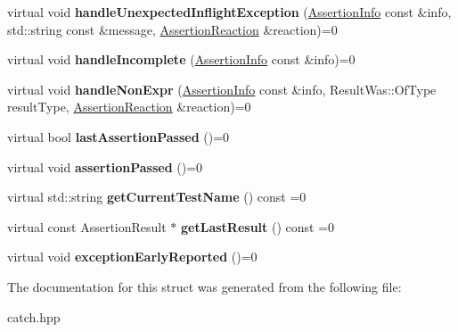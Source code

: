 \begin{DoxyCompactItemize}
\item 
\mbox{\label{structCatch_1_1IResultCapture_afc97bc69829185222f955ebeef97adfe}} 
virtual void {\bfseries handle\+Unexpected\+Inflight\+Exception} (\hyperlink{structCatch_1_1AssertionInfo}{Assertion\+Info} const \&info, std\+::string const \&message, \hyperlink{structCatch_1_1AssertionReaction}{Assertion\+Reaction} \&reaction)=0
\item 
\mbox{\label{structCatch_1_1IResultCapture_a89b89372eb09cc44f8dcad363de6157d}} 
virtual void {\bfseries handle\+Incomplete} (\hyperlink{structCatch_1_1AssertionInfo}{Assertion\+Info} const \&info)=0
\item 
\mbox{\label{structCatch_1_1IResultCapture_ab7dbdf8aa28427119583e24dbb302c63}} 
virtual void {\bfseries handle\+Non\+Expr} (\hyperlink{structCatch_1_1AssertionInfo}{Assertion\+Info} const \&info, Result\+Was\+::\+Of\+Type result\+Type, \hyperlink{structCatch_1_1AssertionReaction}{Assertion\+Reaction} \&reaction)=0
\item 
\mbox{\label{structCatch_1_1IResultCapture_a973435fbdcb2f6f07a0ec5719a01e956}} 
virtual bool {\bfseries last\+Assertion\+Passed} ()=0
\item 
\mbox{\label{structCatch_1_1IResultCapture_a9b0ef2cb071e9a9dc6ec1b533026aea7}} 
virtual void {\bfseries assertion\+Passed} ()=0
\item 
\mbox{\label{structCatch_1_1IResultCapture_aea1617f4a84cc648246aa3ed6918b5bf}} 
virtual std\+::string {\bfseries get\+Current\+Test\+Name} () const =0
\item 
\mbox{\label{structCatch_1_1IResultCapture_ab18872c89fab97405a56e9c6a4919736}} 
virtual const Assertion\+Result $\ast$ {\bfseries get\+Last\+Result} () const =0
\item 
\mbox{\label{structCatch_1_1IResultCapture_ae63ecec95db4c236c63ecf616f483810}} 
virtual void {\bfseries exception\+Early\+Reported} ()=0
\end{DoxyCompactItemize}


The documentation for this struct was generated from the following file\+:\begin{DoxyCompactItemize}
\item 
catch.\+hpp\end{DoxyCompactItemize}
